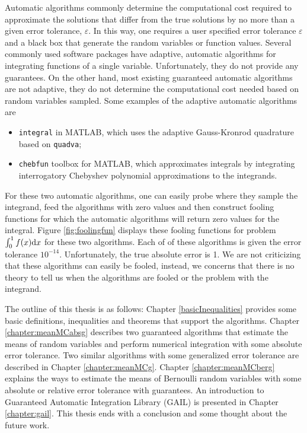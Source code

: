 \documentclass{iitthesis}
\theoremstyle{definition}
\begin{document}
Automatic algorithms commonly determine the computational cost required to approximate the solutions that differ from the true solutions by no more than a given error tolerance, $\varepsilon$. In this way, one requires a user specified error tolerance $\varepsilon$ and a black box that generate the random variables or function values. Several commonly used software packages have adaptive, automatic algorithms for integrating functions of a single variable. Unfortunately, they do not provide any guarantees. On the other hand, most existing guaranteed automatic algorithms are not adaptive, they do not determine the computational cost needed based on random variables sampled. Some examples of the adaptive automatic algorithms are
\begin{itemize}
\item {\tt integral} \cite{Shampone08} in MATLAB, which uses the adaptive Gauss-Kronrod quadrature based on {\tt quadva};
\item {\tt chebfun} toolbox \cite{Chebfun14} for MATLAB, which approximates integrals by integrating interrogatory Chebyshev polynomial approximations to the integrands.
\end{itemize}
For these two automatic algorithms, one can easily probe where they sample the integrand, feed the algorithms with zero values and then construct fooling functions for which the automatic algorithms will return zero values for the integral. Figure \ref{fig:foolingfun} displays these fooling functions for problem $\int_0^1f(x){\rm d} x$ for these two algorithms. Each of of these algorithms is given the error tolerance $10^{-14}$. Unfortunately, the true absolute error is 1. We are not criticizing that these algorithms can easily be fooled, instead, we concerns that there is no theory to tell us when the algorithms are fooled or the problem with the integrand.



The outline of this thesis is as follows: Chapter \ref{basicInequalities} provides some basic definitions, inequalities and theorems that support the algorithms. Chapter \ref{chapter:meanMCabsg} describes two guaranteed algorithms that estimate the means of random variables and perform numerical integration with some absolute error tolerance. Two similar algorithms with some generalized error tolerance are described in Chapter \ref{chapter:meanMCg}. Chapter \ref{chapter:meanMCberg} explains the ways to estimate the means of Bernoulli random variables with some absolute or relative error tolerance with guarantees. An introduction to Guaranteed Automatic Integration Library (GAIL) is presented in Chapter \ref{chapter:gail}. This thesis ends with a conclusion and some thought about the future work.
\end{document}
